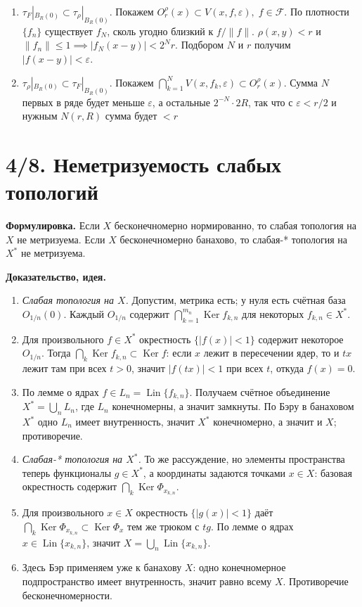 \documentclass[10pt,a4paper]{article}
\newcommand{\X}{X}
\newcommand{\Lin}{\operatorname{Lin}}
\newcommand{\Ker}{\operatorname{Ker}}
\begin{document}
	\begin{enumerate}
		\item
		$\tau_F|_{B_R(0)}
		\subset\tau_\rho|_{B_R(0)}$.
		Покажем $O_r^\rho(x) \subset V(x,f,\varepsilon), \; f\in\mathcal F$.
		По плотности $\{f_n\}$ существует $f_N$,
		сколь угодно близкий к $f/\|f\|$.
		$\rho(x,y)<r$ и $\|f_n\| \leq 1 \implies |f_N(x-y)|<2^Nr$.
		Подбором $N$ и $r$
		получим $|f(x-y)|<\varepsilon$.

		\item
		$\tau_\rho|_{B_R(0)}
		\subset\tau_F|_{B_R(0)}$.
		Покажем $\bigcap_{k=1}^{N}V(x,f_k,\varepsilon)
		\subset O_r^\rho(x)$.
		Сумма $N$ первых в ряде будет меньше $\varepsilon$, а остальные $2^{-N}\cdot 2R$, так что с $\varepsilon < r/2$ и нужным $N(r, R)$ сумма будет $<r$

	\end{enumerate}

	\section*{4/8. Неметризуемость слабых топологий}
	\textbf{Формулировка.} Если $\X$ бесконечномерно нормированно, то слабая топология на $\X$ не метризуема. Если $\X$ бесконечномерно банахово, то слабая-* топология на $\X^\ast$ не метризуема.

	\textbf{Доказательство, идея.}
	\begin{enumerate}
		\item \textit{Слабая топология на $\X$.} Допустим, метрика есть; у нуля есть счётная база $O_{1/n}(0)$. Каждый $O_{1/n}$ содержит $\bigcap_{k=1}^{m_n}\Ker f_{k,n}$ для некоторых $f_{k,n}\in\X^\ast$.
		\item Для произвольного $f\in\X^\ast$ окрестность $\{|f(x)|<1\}$ содержит некоторое $O_{1/n}$. Тогда $\bigcap_k\Ker f_{k,n}\subset\Ker f$: если $x$ лежит в пересечении ядер, то и $tx$ лежит там при всех $t>0$, значит $|f(tx)|<1$ при всех $t$, откуда $f(x)=0$.
		\item По лемме о ядрах $f\in L_n=\Lin\{f_{k,n}\}$. Получаем счётное объединение $\X^\ast=\bigcup_nL_n$, где $L_n$ конечномерны, а значит замкнуты. По Бэру в банаховом $\X^\ast$ одно $L_n$ имеет внутренность, значит $\X^\ast$ конечномерно, а значит и $\X$; противоречие.
		\item \textit{Слабая-* топология на $\X^\ast$.} То же рассуждение, но элементы пространства теперь функционалы $g\in\X^\ast$, а координаты задаются точками $x\in\X$: базовая окрестность содержит $\bigcap_k\Ker\Phi_{x_{k,n}}$.
		\item Для произвольного $x\in\X$ окрестность $\{|g(x)|<1\}$ даёт $\bigcap_k\Ker\Phi_{x_{k,n}}\subset\Ker\Phi_x$ тем же трюком с $tg$. По лемме о ядрах $x\in\Lin\{x_{k,n}\}$, значит $\X=\bigcup_n\Lin\{x_{k,n}\}$.
		\item Здесь Бэр применяем уже к банахову $\X$: одно конечномерное подпространство имеет внутренность, значит равно всему $\X$. Противоречие бесконечномерности.
	\end{enumerate}
\end{document}
